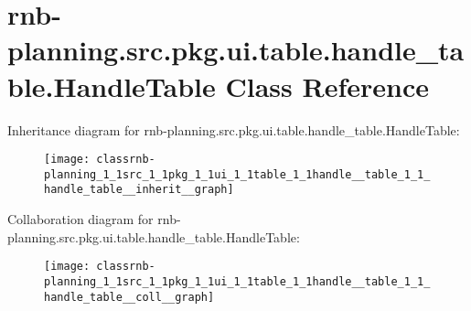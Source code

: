 \hypertarget{classrnb-planning_1_1src_1_1pkg_1_1ui_1_1table_1_1handle__table_1_1_handle_table}{}\section{rnb-\/planning.src.\+pkg.\+ui.\+table.\+handle\+\_\+table.\+Handle\+Table Class Reference}
\label{classrnb-planning_1_1src_1_1pkg_1_1ui_1_1table_1_1handle__table_1_1_handle_table}


Inheritance diagram for rnb-\/planning.src.\+pkg.\+ui.\+table.\+handle\+\_\+table.\+Handle\+Table\+:
\nopagebreak
\begin{figure}[H]
\begin{center}
\leavevmode
\texttt{[image: classrnb-planning\_1\_1src\_1\_1pkg\_1\_1ui\_1\_1table\_1\_1handle\_\_table\_1\_1\_handle\_table\_\_inherit\_\_graph]}
\end{center}
\end{figure}


Collaboration diagram for rnb-\/planning.src.\+pkg.\+ui.\+table.\+handle\+\_\+table.\+Handle\+Table\+:
\nopagebreak
\begin{figure}[H]
\begin{center}
\leavevmode
\texttt{[image: classrnb-planning\_1\_1src\_1\_1pkg\_1\_1ui\_1\_1table\_1\_1handle\_\_table\_1\_1\_handle\_table\_\_coll\_\_graph]}
\end{center}
\end{figure}

